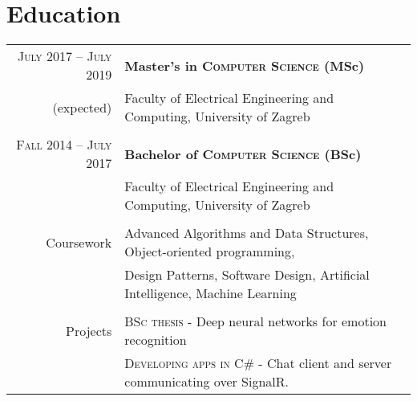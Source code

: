 \documentclass[a4paper,10pt]{article} %
\begin{document}
\vspace{5mm}


\section{Education}

\begin{tabular}{rl}
    \textsc{July 2017 -- July 2019} & \textbf{Master's in \textsc{Computer Science} (MSc)} \\
    \footnotesize{      (expected)} & \footnotesize{Faculty of Electrical Engineering and Computing, University of Zagreb} \\
                                    \\

    \textsc{Fall 2014 -- July 2017} & \textbf{Bachelor of \textsc{Computer Science} (BSc)} \\
                                    & \footnotesize{Faculty of Electrical Engineering and Computing, University of Zagreb} \\
                                    \\

    Coursework & \footnotesize{Advanced Algorithms and Data Structures, Object-oriented programming,} \\
               & \footnotesize{Design Patterns, Software Design, Artificial Intelligence, Machine Learning} \\
               \\

    Projects & \footnotesize{\textsc{BSc thesis} - Deep neural networks for emotion recognition} \\
             & \footnotesize{\textsc{Developing apps in C\#} - Chat client and server communicating over SignalR.} \\

\end{tabular}

\vspace{5mm}

\end{document}
